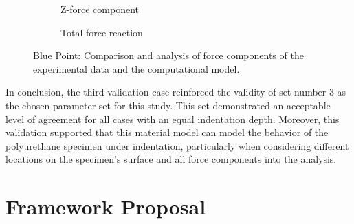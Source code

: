 \begin{figure}[htbp]
\begin{subfigure}[b]{0.45\textwidth}
    \caption{Z-force component}
    \end{subfigure}  
    \hspace{0.3cm}
    \begin{subfigure}[b]{0.45\textwidth}
    \centering
    \caption{Total force reaction}
    \end{subfigure}
    
    \caption[Blue point force components comparison]{Blue Point: Comparison and analysis of force components of the experimental data and the computational model.}
    \label{fig:bpforcecompvc}
\end{figure}

In conclusion, the third validation case reinforced the validity of set number
\SI{3}{} as the chosen parameter set for this study. This set 
demonstrated an acceptable level of agreement for all cases with an equal 
indentation depth. Moreover, this validation supported that this material model 
can model the behavior of the polyurethane specimen under indentation, particularly
when considering different locations on the specimen's surface and all 
force components into the analysis.
\section{Framework Proposal}

